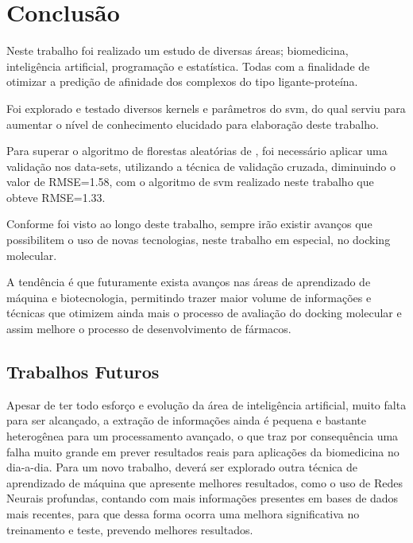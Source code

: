 \documentclass[tcc, capa]{texucpel}
\begin{document}
\chapter{Conclusão}
Neste trabalho foi realizado um estudo de diversas áreas; biomedicina, inteligência artificial, programação e estatística. Todas com a finalidade de otimizar a predição de afinidade dos complexos do tipo ligante-proteína.

Foi explorado e testado diversos kernels e parâmetros do svm, do qual serviu para aumentar o nível de conhecimento elucidado para elaboração deste trabalho. 

Para superar o algoritmo de florestas aleatórias de \citeauthor{ballester2010machine}, foi necessário aplicar uma validação nos data-sets, utilizando a técnica de validação cruzada, diminuindo o valor de RMSE=1.58, com o algoritmo de svm realizado neste trabalho que obteve RMSE=1.33.

Conforme foi visto ao longo deste trabalho, sempre irão existir avanços que possibilitem o uso de novas tecnologias, neste trabalho em especial, no docking molecular.

A tendência é que futuramente exista avanços nas áreas de aprendizado de máquina e biotecnologia, permitindo trazer maior volume de informações e técnicas que otimizem ainda mais o processo de avaliação do docking molecular e assim melhore o processo de desenvolvimento de fármacos.

\section{Trabalhos Futuros}

Apesar de ter todo esforço e evolução da área de inteligência artificial, muito falta para ser alcançado, a extração de informações ainda é pequena e bastante heterogênea para um processamento avançado, o que traz por consequência uma falha muito grande em prever resultados reais para aplicações da biomedicina no dia-a-dia.
Para um novo trabalho, deverá ser explorado outra técnica de aprendizado de máquina que apresente melhores resultados, como o uso de Redes Neurais profundas, contando com mais informações presentes em bases de dados mais recentes, para que dessa forma ocorra uma melhora significativa no treinamento e teste, prevendo melhores resultados.



\end{document}
